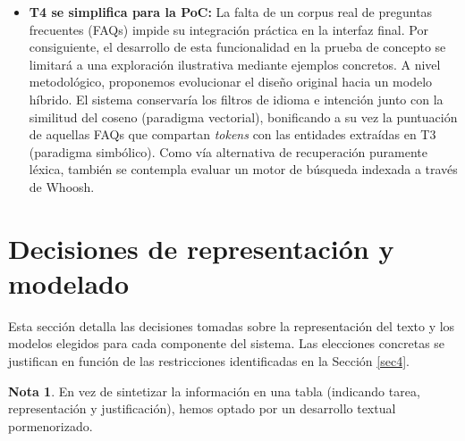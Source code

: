 \documentclass[11pt,a4paper,twoside]{article}
\theoremstyle{definition}
\newtheorem{nota}{Nota}
\numberwithin{equation}{section}
\begin{document}
\begin{itemize}
	\item \textbf{T4 se simplifica para la PoC:} La falta de un corpus real de preguntas frecuentes (FAQs) impide su integración práctica en la interfaz final. Por consiguiente, el desarrollo de esta funcionalidad en la prueba de concepto se limitará a una exploración ilustrativa mediante ejemplos concretos. A nivel metodológico, proponemos evolucionar el diseño original hacia un modelo híbrido. El sistema conservaría los filtros de idioma e intención junto con la similitud del coseno (paradigma vectorial), bonificando a su vez la puntuación de aquellas FAQs que compartan \textit{tokens} con las entidades extraídas en T3 (paradigma simbólico). Como vía alternativa de recuperación puramente léxica, también se contempla evaluar un motor de búsqueda indexada a través de Whoosh.
\end{itemize}


\section{Decisiones de representación y modelado}
Esta sección detalla las decisiones tomadas sobre la representación del texto y los modelos elegidos para cada componente del sistema. Las elecciones concretas se justifican en función de las restricciones identificadas en la Sección \ref{sec4}. 

\begin{nota}
	En vez de sintetizar la información en una tabla (indicando tarea, representación y justificación), hemos optado por un desarrollo textual pormenorizado.
\end{nota}
\end{document}
